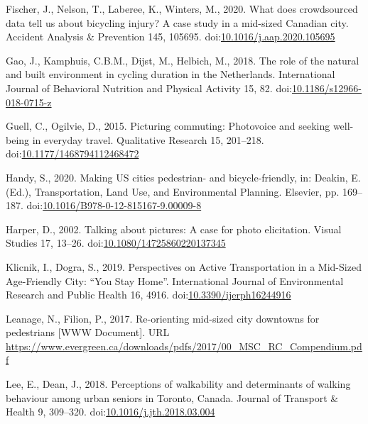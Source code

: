 \documentclass[]{elsarticle} %
\begin{document}
\leavevmode\hypertarget{ref-fischerWhatDoesCrowdsourced2020}{}%
Fischer, J., Nelson, T., Laberee, K., Winters, M., 2020. What does
crowdsourced data tell us about bicycling injury? A case study in a
mid-sized Canadian city. Accident Analysis \& Prevention 145, 105695.
doi:\href{https://doi.org/10.1016/j.aap.2020.105695}{10.1016/j.aap.2020.105695}

\leavevmode\hypertarget{ref-gaoRoleNaturalBuilt2018}{}%
Gao, J., Kamphuis, C.B.M., Dijst, M., Helbich, M., 2018. The role of the
natural and built environment in cycling duration in the Netherlands.
International Journal of Behavioral Nutrition and Physical Activity 15,
82.
doi:\href{https://doi.org/10.1186/s12966-018-0715-z}{10.1186/s12966-018-0715-z}

\leavevmode\hypertarget{ref-guellPicturingCommutingPhotovoice2015}{}%
Guell, C., Ogilvie, D., 2015. Picturing commuting: Photovoice and
seeking well-being in everyday travel. Qualitative Research 15,
201--218.
doi:\href{https://doi.org/10.1177/1468794112468472}{10.1177/1468794112468472}

\leavevmode\hypertarget{ref-handyMakingUSCities2020}{}%
Handy, S., 2020. Making US cities pedestrian- and bicycle-friendly, in:
Deakin, E. (Ed.), Transportation, Land Use, and Environmental Planning.
Elsevier, pp. 169--187.
doi:\href{https://doi.org/10.1016/B978-0-12-815167-9.00009-8}{10.1016/B978-0-12-815167-9.00009-8}

\leavevmode\hypertarget{ref-harperTalkingPicturesCase2002}{}%
Harper, D., 2002. Talking about pictures: A case for photo elicitation.
Visual Studies 17, 13--26.
doi:\href{https://doi.org/10.1080/14725860220137345}{10.1080/14725860220137345}

\leavevmode\hypertarget{ref-klicnikPerspectivesActiveTransportation2019}{}%
Klicnik, I., Dogra, S., 2019. Perspectives on Active Transportation in a
Mid-Sized Age-Friendly City: ``You Stay Home''. International Journal of
Environmental Research and Public Health 16, 4916.
doi:\href{https://doi.org/10.3390/ijerph16244916}{10.3390/ijerph16244916}

\leavevmode\hypertarget{ref-leanagereorientingmidsized2017}{}%
Leanage, N., Filion, P., 2017. Re-orienting mid-sized city downtowns for
pedestrians {[}WWW Document{]}. URL
\url{https://www.evergreen.ca/downloads/pdfs/2017/00_MSC_RC_Compendium.pdf}

\leavevmode\hypertarget{ref-leePerceptionsWalkabilityDeterminants2018}{}%
Lee, E., Dean, J., 2018. Perceptions of walkability and determinants of
walking behaviour among urban seniors in Toronto, Canada. Journal of
Transport \& Health 9, 309--320.
doi:\href{https://doi.org/10.1016/j.jth.2018.03.004}{10.1016/j.jth.2018.03.004}
\end{document}
